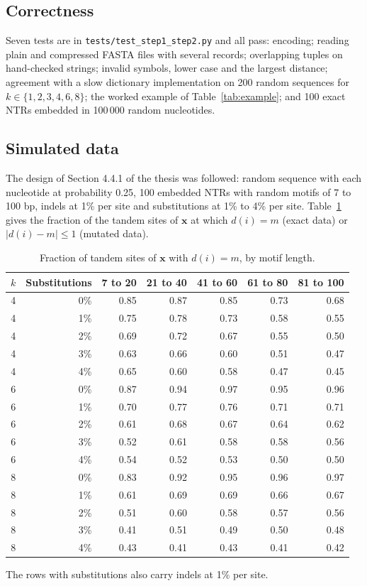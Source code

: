 \documentclass[11pt,a4paper]{article}
\begin{document}
\subsection{Correctness}
Seven tests are in \texttt{tests/test\_step1\_step2.py} and all pass:
encoding; reading plain and compressed FASTA files with several records;
overlapping tuples on hand-checked strings; invalid symbols, lower case and the
largest distance; agreement with a slow dictionary implementation on 200 random
sequences for $k\in\{1,2,3,4,6,8\}$; the worked example of
Table~\ref{tab:example}; and 100 exact NTRs embedded in 100\,000 random
nucleotides.

\subsection{Simulated data}
The design of Section 4.4.1 of the thesis was followed: random sequence with
each nucleotide at probability 0.25, 100 embedded NTRs with random motifs of 7
to 100 bp, indels at 1\% per site and substitutions at 1\% to 4\% per site.
Table~\ref{tab:signal} gives the fraction of the tandem sites of $\mathbf{x}$
at which $d(i)=m$ (exact data) or $|d(i)-m|\le 1$ (mutated data).
\begin{table}[h]\centering
\caption{Fraction of tandem sites of $\mathbf{x}$ with $d(i)=m$, by motif length.}\label{tab:signal}
\begin{tabular}{rrrrrrr}
\toprule
$k$ & Substitutions & 7 to 20 & 21 to 40 & 41 to 60 & 61 to 80 & 81 to 100 \\
\midrule
4 & 0\% & 0.85 & 0.87 & 0.85 & 0.73 & 0.68 \\
4 & 1\% & 0.75 & 0.78 & 0.73 & 0.58 & 0.55 \\
4 & 2\% & 0.69 & 0.72 & 0.67 & 0.55 & 0.50 \\
4 & 3\% & 0.63 & 0.66 & 0.60 & 0.51 & 0.47 \\
4 & 4\% & 0.65 & 0.60 & 0.58 & 0.47 & 0.45 \\
\midrule
6 & 0\% & 0.87 & 0.94 & 0.97 & 0.95 & 0.96 \\
6 & 1\% & 0.70 & 0.77 & 0.76 & 0.71 & 0.71 \\
6 & 2\% & 0.61 & 0.68 & 0.67 & 0.64 & 0.62 \\
6 & 3\% & 0.52 & 0.61 & 0.58 & 0.58 & 0.56 \\
6 & 4\% & 0.54 & 0.52 & 0.53 & 0.50 & 0.50 \\
\midrule
8 & 0\% & 0.83 & 0.92 & 0.95 & 0.96 & 0.97 \\
8 & 1\% & 0.61 & 0.69 & 0.69 & 0.66 & 0.67 \\
8 & 2\% & 0.51 & 0.60 & 0.58 & 0.57 & 0.56 \\
8 & 3\% & 0.41 & 0.51 & 0.49 & 0.50 & 0.48 \\
8 & 4\% & 0.43 & 0.41 & 0.43 & 0.41 & 0.42 \\
\bottomrule
\end{tabular}

\smallskip
{\footnotesize The rows with substitutions also carry indels at 1\% per site.}
\end{table}
\end{document}
